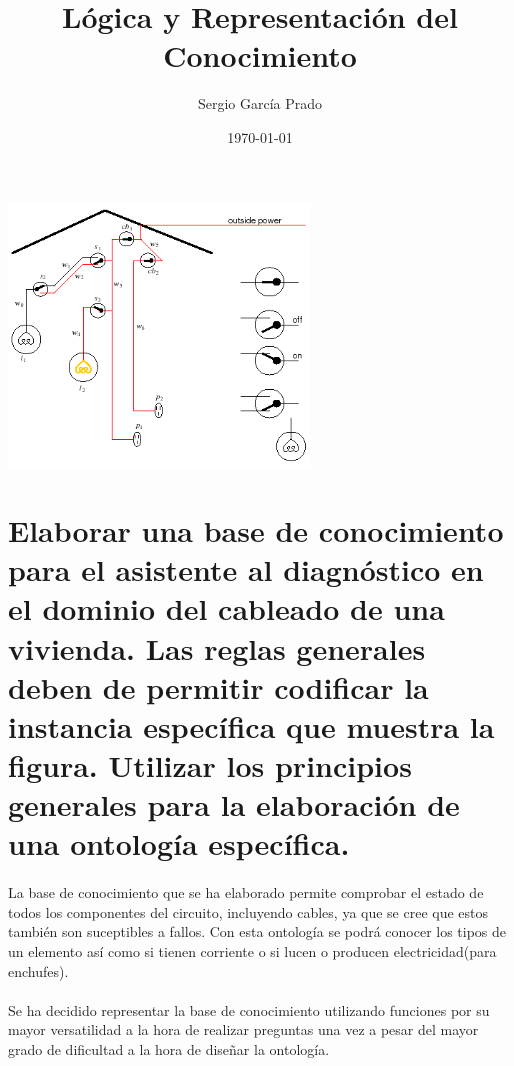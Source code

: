 \documentclass[10pt, a4paper,spanish]{article}
\title{\vspace{-15mm}\fontsize{24pt}{10pt}\selectfont\textbf{Lógica y Representación del Conocimiento}} %
\author{Sergio García Prado}
\date{\today}
\begin{document}
	\maketitle %

	\thispagestyle{fancy} %


	\begin{center}
		\includegraphics[width=0.6\textwidth]{diagnostic-assistant}
	\end{center}

	\section{Elaborar una base de conocimiento para el asistente al diagnóstico en el dominio del cableado de una vivienda. Las reglas generales deben de permitir codificar la instancia específica que muestra la figura. Utilizar los principios generales para la elaboración de una ontología específica.}

		\paragraph{}
		La base de conocimiento que se ha elaborado permite comprobar el estado de todos los componentes del circuito, incluyendo cables, ya que se cree que estos también son suceptibles a fallos. Con esta ontología se podrá conocer los tipos de un elemento así como si tienen corriente o si lucen o producen electricidad(para enchufes).

		\paragraph{}
		Se ha decidido representar la base de conocimiento utilizando funciones por su mayor versatilidad a la hora de realizar preguntas una vez a pesar del mayor grado de dificultad a la hora de diseñar la ontología.
\end{document}
